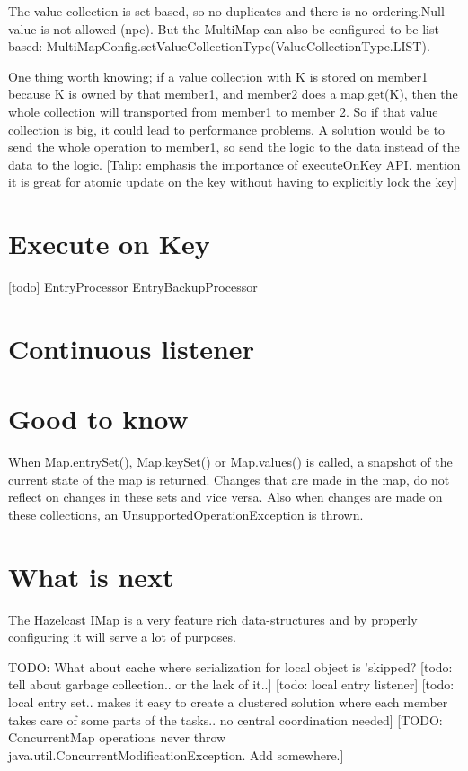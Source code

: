 The value collection is set based, so no duplicates and there is no ordering.Null value is not allowed (npe). But the MultiMap can also be configured to be list based: MultiMapConfig.setValueCollectionType(ValueCollectionType.LIST). 

One thing worth knowing; if a value collection with K is stored on member1 because K is owned by that member1, and member2 does a map.get(K), then the whole collection will transported from member1 to member 2. So if that value collection is big, it could lead to performance problems. A solution would be to send the whole operation to member1, so send the logic to the data instead of the data to the logic.
[Talip: emphasis the importance of executeOnKey API. mention it is great for atomic update on the key without having to explicitly lock the key]
\section{Execute on Key}
[todo]
EntryProcessor
EntryBackupProcessor

\section{Continuous listener}

\section{Good to know}

When Map.entrySet(), Map.keySet() or Map.values() is called, a snapshot of the current state of the map is returned. Changes that are made in the map, do not reflect on changes in these sets and vice versa. Also when changes are made on these collections, an UnsupportedOperationException is thrown.

\section{What is next}
The Hazelcast IMap is a very feature rich data-structures and by properly configuring it will serve a lot of purposes.

TODO: What about cache where serialization for local object is 'skipped?
[todo: tell about garbage collection.. or the lack of it..]
[todo: local entry listener]
[todo: local entry set.. makes it easy to create a clustered solution where each member takes care of some parts of the tasks.. no central coordination needed]
[TODO: ConcurrentMap operations never throw java.util.ConcurrentModificationException. Add somewhere.]


